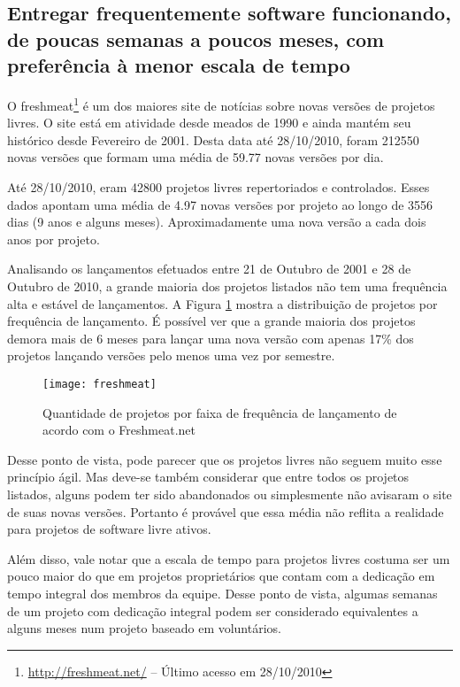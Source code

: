 \subsection[Entregas frequentes]{Entregar frequentemente software
  funcionando, de poucas semanas a poucos meses, com preferência à
  menor escala de tempo}

O freshmeat\footnote{\url{http://freshmeat.net/} -- Último acesso em
  28/10/2010} é um dos maiores site de notícias sobre novas versões de
projetos livres. O site está em atividade desde meados de 1990 e ainda
mantém seu histórico desde Fevereiro de 2001. Desta data até
28/10/2010, foram 212550 novas versões que formam uma média de 59.77
novas versões por dia.

Até 28/10/2010, eram 42800 projetos livres repertoriados e
controlados. Esses dados apontam uma média de 4.97 novas versões por
projeto ao longo de 3556 dias (9 anos e alguns meses).
Aproximadamente uma nova versão a cada dois anos por projeto.

Analisando os lançamentos efetuados entre 21 de Outubro de 2001 e 28
de Outubro de 2010, a grande maioria dos projetos listados não tem uma
frequência alta e estável de lançamentos. A Figura \ref{fig:freshmeat}
mostra a distribuição de projetos por frequência de lançamento. É
possível ver que a grande maioria dos projetos demora mais de 6 meses
para lançar uma nova versão com apenas 17\% dos projetos lançando
versões pelo menos uma vez por semestre.


\begin{figure}
  \centering
  \texttt{[image: freshmeat]}
  \caption{Quantidade de projetos por faixa de frequência de
    lançamento de acordo com o Freshmeat.net}
  \label{fig:freshmeat}
\end{figure}

Desse ponto de vista, pode parecer que os projetos livres não seguem
muito esse princípio ágil. Mas deve-se também considerar que entre
todos os projetos listados, alguns podem ter sido abandonados ou
simplesmente não avisaram o site de suas novas versões. Portanto é
provável que essa média não reflita a realidade para projetos de
software livre ativos.

Além disso, vale notar que a escala de tempo para projetos livres
costuma ser um pouco maior do que em projetos proprietários que contam
com a dedicação em tempo integral dos membros da equipe. Desse ponto
de vista, algumas semanas de um projeto com dedicação integral podem
ser considerado equivalentes a alguns meses num projeto baseado em
voluntários.


